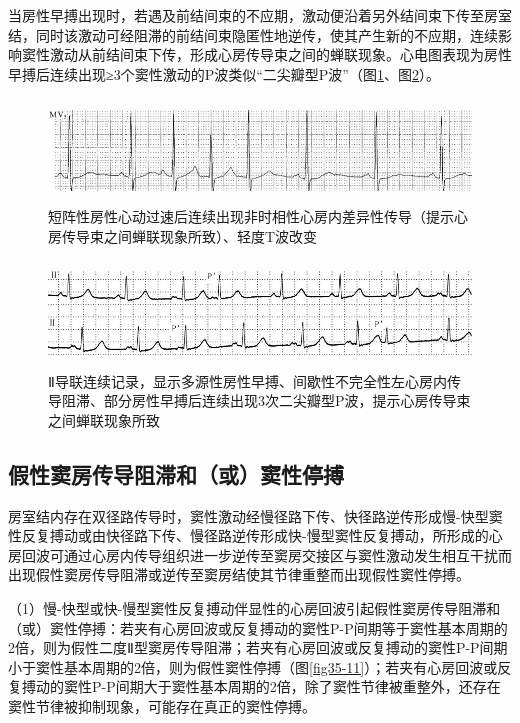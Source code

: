当房性早搏出现时，若遇及前结间束的不应期，激动便沿着另外结间束下传至房室结，同时该激动可经阻滞的前结间束隐匿性地逆传，使其产生新的不应期，连续影响窦性激动从前结间束下传，形成心房传导束之间的蝉联现象。心电图表现为房性早搏后连续出现≥3个窦性激动的P波类似“二尖瓣型P波”（图\ref{fig35-9}、图\ref{fig35-10}）。

\begin{figure}[!htbp]
 \centering
 \includegraphics[width=5.67708in,height=1.08333in]{./images/Image00562.jpg}
 \captionsetup{justification=centering}
 \caption{短阵性房性心动过速后连续出现非时相性心房内差异性传导（提示心房传导束之间蝉联现象所致）、轻度T波改变}
 \label{fig35-9}
  \end{figure} 

\begin{figure}[!htbp]
 \centering
 \includegraphics[width=5.58333in,height=1.11458in]{./images/Image00563.jpg}
 \captionsetup{justification=centering}
 \caption{Ⅱ导联连续记录，显示多源性房性早搏、间歇性不完全性左心房内传导阻滞、部分房性早搏后连续出现3次二尖瓣型P波，提示心房传导束之间蝉联现象所致}
 \label{fig35-10}
  \end{figure} 

\protect\hypertarget{text00042.htmlux5cux23subid458}{}{}

\subsection{假性窦房传导阻滞和（或）窦性停搏}

房室结内存在双径路传导时，窦性激动经慢径路下传、快径路逆传形成慢-快型窦性反复搏动或由快径路下传、慢径路逆传形成快-慢型窦性反复搏动，所形成的心房回波可通过心房内传导组织进一步逆传至窦房交接区与窦性激动发生相互干扰而出现假性窦房传导阻滞或逆传至窦房结使其节律重整而出现假性窦性停搏。

（1）慢-快型或快-慢型窦性反复搏动伴显性的心房回波引起假性窦房传导阻滞和（或）窦性停搏：若夹有心房回波或反复搏动的窦性P-P间期等于窦性基本周期的2倍，则为假性二度Ⅱ型窦房传导阻滞；若夹有心房回波或反复搏动的窦性P-P间期小于窦性基本周期的2倍，则为假性窦性停搏（图\ref{fig35-11}）；若夹有心房回波或反复搏动的窦性P-P间期大于窦性基本周期的2倍，除了窦性节律被重整外，还存在窦性节律被抑制现象，可能存在真正的窦性停搏。

